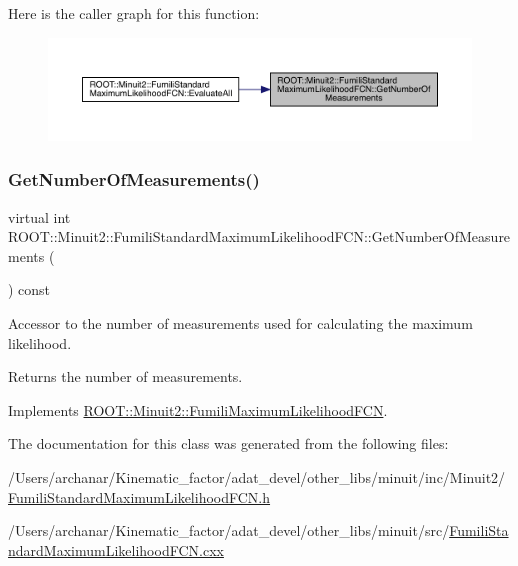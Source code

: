 Here is the caller graph for this function\+:\nopagebreak
\begin{figure}[H]
\begin{center}
\leavevmode
\includegraphics[width=350pt]{dd/d40/classROOT_1_1Minuit2_1_1FumiliStandardMaximumLikelihoodFCN_a09175207d6c0ed94898f3985b4d376d2_icgraph}
\end{center}
\end{figure}
\mbox{\label{classROOT_1_1Minuit2_1_1FumiliStandardMaximumLikelihoodFCN_a7c1f879db750fb33c206d3edbbd19ae0}} 
\subsubsection{\texorpdfstring{GetNumberOfMeasurements()}{GetNumberOfMeasurements()}\hspace{0.1cm}{\footnotesize\ttfamily [2/2]}}
{\footnotesize\ttfamily virtual int R\+O\+O\+T\+::\+Minuit2\+::\+Fumili\+Standard\+Maximum\+Likelihood\+F\+C\+N\+::\+Get\+Number\+Of\+Measurements (\begin{DoxyParamCaption}{ }\end{DoxyParamCaption}) const\hspace{0.3cm}{\ttfamily [virtual]}}

Accessor to the number of measurements used for calculating the maximum likelihood.

\begin{DoxyReturn}{Returns}
the number of measurements. 
\end{DoxyReturn}


Implements \mbox{\hyperlink{classROOT_1_1Minuit2_1_1FumiliMaximumLikelihoodFCN_af0a6b5a302f978363074039c7d55d529}{R\+O\+O\+T\+::\+Minuit2\+::\+Fumili\+Maximum\+Likelihood\+F\+CN}}.



The documentation for this class was generated from the following files\+:\begin{DoxyCompactItemize}
\item 
/\+Users/archanar/\+Kinematic\+\_\+factor/adat\+\_\+devel/other\+\_\+libs/minuit/inc/\+Minuit2/\mbox{\hyperlink{other__libs_2minuit_2inc_2Minuit2_2FumiliStandardMaximumLikelihoodFCN_8h}{Fumili\+Standard\+Maximum\+Likelihood\+F\+C\+N.\+h}}\item 
/\+Users/archanar/\+Kinematic\+\_\+factor/adat\+\_\+devel/other\+\_\+libs/minuit/src/\mbox{\hyperlink{FumiliStandardMaximumLikelihoodFCN_8cxx}{Fumili\+Standard\+Maximum\+Likelihood\+F\+C\+N.\+cxx}}\end{DoxyCompactItemize}
